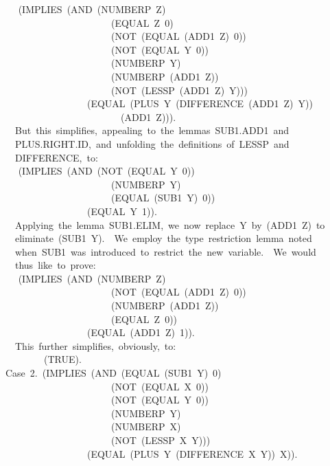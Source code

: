 \documentclass[10pt]{book}
\newenvironment{pubasis}{\begin{flushleft}}{\end{flushleft}}
\begin{document}
\begin{pubasis}
~~	~~(IMPLIES~(AND~(NUMBERP~Z)\\
~~~~~~~~~~~~~~~~~~~~~~~~(EQUAL~Z~0)\\
~~~~~~~~~~~~~~~~~~~~~~~~(NOT~(EQUAL~(ADD1~Z)~0))\\
~~~~~~~~~~~~~~~~~~~~~~~~(NOT~(EQUAL~Y~0))\\
~~~~~~~~~~~~~~~~~~~~~~~~(NUMBERP~Y)\\
~~~~~~~~~~~~~~~~~~~~~~~~(NUMBERP~(ADD1~Z))\\
~~~~~~~~~~~~~~~~~~~~~~~~(NOT~(LESSP~(ADD1~Z)~Y)))\\
~~~~~~~~~~~~~~~~~~~(EQUAL~(PLUS~Y~(DIFFERENCE~(ADD1~Z)~Y))\\
~~~~~~~~~~~~~~~~~~~~~~~~~~(ADD1~Z))).\\

~~~~But~this~simplifies,~appealing~to~the~lemmas~SUB1.ADD1~and\\
~~~~PLUS.RIGHT.ID,~and~unfolding~the~definitions~of~LESSP~and\\
~~~~DIFFERENCE,~to:\\

~~	~~(IMPLIES~(AND~(NOT~(EQUAL~Y~0))\\
~~~~~~~~~~~~~~~~~~~~~~~~(NUMBERP~Y)\\
~~~~~~~~~~~~~~~~~~~~~~~~(EQUAL~(SUB1~Y)~0))\\
~~~~~~~~~~~~~~~~~~~(EQUAL~Y~1)).\\

~~~~Applying~the~lemma~SUB1.ELIM,~we~now~replace~Y~by~(ADD1~Z)~to\\
~~~~eliminate~(SUB1~Y).~~We~employ~the~type~restriction~lemma~noted\\
~~~~when~SUB1~was~introduced~to~restrict~the~new~variable.~~We~would\\
~~~~thus~like~to~prove:\\

~~	~~(IMPLIES~(AND~(NUMBERP~Z)\\
~~~~~~~~~~~~~~~~~~~~~~~~(NOT~(EQUAL~(ADD1~Z)~0))\\
~~~~~~~~~~~~~~~~~~~~~~~~(NUMBERP~(ADD1~Z))\\
~~~~~~~~~~~~~~~~~~~~~~~~(EQUAL~Z~0))\\
~~~~~~~~~~~~~~~~~~~(EQUAL~(ADD1~Z)~1)).\\

~~~~This~further~simplifies,~obviously,~to:\\

~~~~~~~~~~(TRUE).\\

~~Case~2.~(IMPLIES~(AND~(EQUAL~(SUB1~Y)~0)\\
~~~~~~~~~~~~~~~~~~~~~~~~(NOT~(EQUAL~X~0))\\
~~~~~~~~~~~~~~~~~~~~~~~~(NOT~(EQUAL~Y~0))\\
~~~~~~~~~~~~~~~~~~~~~~~~(NUMBERP~Y)\\
~~~~~~~~~~~~~~~~~~~~~~~~(NUMBERP~X)\\
~~~~~~~~~~~~~~~~~~~~~~~~(NOT~(LESSP~X~Y)))\\
~~~~~~~~~~~~~~~~~~~(EQUAL~(PLUS~Y~(DIFFERENCE~X~Y))~X)).\\


\end{pubasis}
\end{document}
